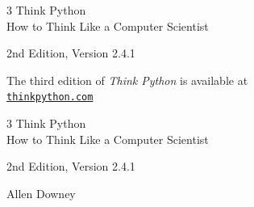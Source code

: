\documentclass[10pt]{book}
\newcommand{\theversion}{2nd Edition, Version 2.4.1}
\newcommand{\thedate}{}
\begin{document}
\begin{latexonly}

\renewcommand{\blankpage}{\thispagestyle{empty} \quad \newpage}



\thispagestyle{empty}

\begin{flushright}
\vspace*{2.0in}

\begin{spacing}{3}
{\huge Think Python}\\
{\Large How to Think Like a Computer Scientist}
\end{spacing}

\vspace{0.25in}

\theversion

\thedate

\vfill

{\large The third edition of \emph{Think Python} is available at\\
\href{https://thinkpython.com}{\nolinkurl{thinkpython.com}}}

\end{flushright}


\blankpage
\blankpage

\pagebreak
\thispagestyle{empty}

\begin{flushright}
\vspace*{2.0in}

\begin{spacing}{3}
{\huge Think Python}\\
{\Large How to Think Like a Computer Scientist}
\end{spacing}

\vspace{0.25in}

\theversion

\thedate

\vspace{1in}


{\Large
Allen Downey\\
}



\end{flushright}
\end{latexonly}
\end{document}
